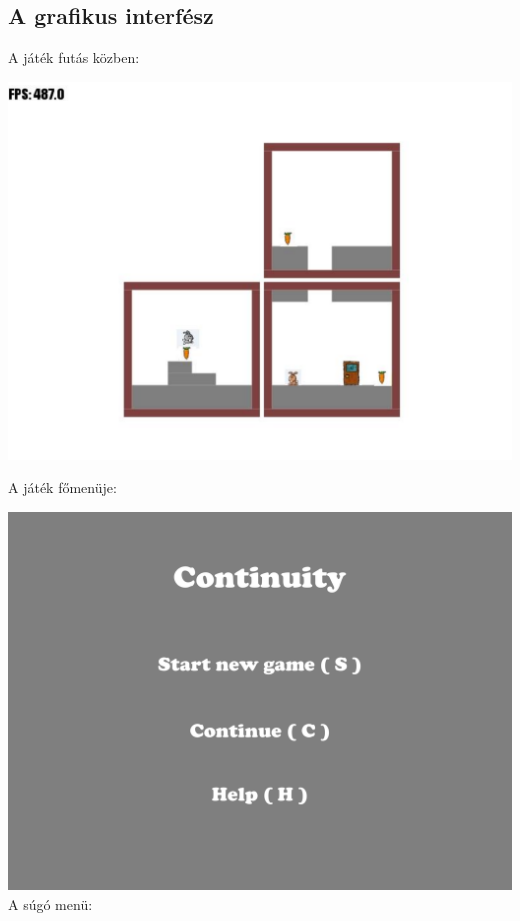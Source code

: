 \subsection{A grafikus interfész}
	\graphicspath{{PdfImages/}}
	\begin{center}
	A játék futás közben:
	
	\includegraphics[scale=0.7]{ScreenPlay.pdf}
	\newpage

	A játék főmenüje:
	
	\includegraphics[scale=0.5]{ScreenMenu.pdf} \\

	A súgó menü:
	

\end{center}
